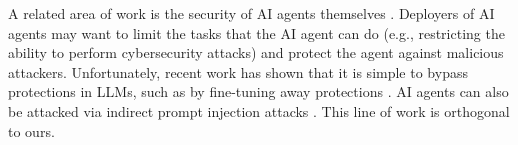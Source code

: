 A related area of work is the security of AI agents themselves
\cite{greshake2023more, kang2023exploiting, zou2023universal, zhan2023removing,
qi2023fine, yang2023shadow}. Deployers of AI agents may want to limit the tasks
that the AI agent can do (e.g., restricting the ability to perform cybersecurity
attacks) and protect the agent against malicious attackers. Unfortunately,
recent work has shown that it is simple to bypass protections in LLMs, such as
by fine-tuning away protections \cite{zhan2023removing, yang2023shadow,
qi2023fine}. AI agents can also be attacked via indirect prompt injection
attacks \cite{greshake2023not, yi2023benchmarking, zhan2024injecagent}. This
line of work is orthogonal to ours.
